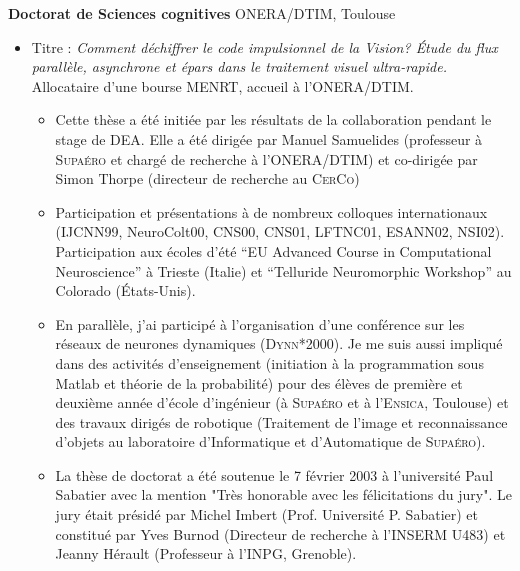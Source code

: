 \documentclass[10pt,french,a4paper,oneside]{article}%
\newcommand{\years}[1]{\marginpar{\textit{\scriptsize #1}}}
\begin{document}
\vspace*{.3cm}
	\textbf{Doctorat de Sciences cognitives} ONERA/DTIM, Toulouse \hfill \years{\textbf{1999-2003}} \\
\vspace*{-.15in}
\begin{itemize}
\item[] Titre : \emph{Comment déchiffrer le code impulsionnel de la Vision? \'Etude du flux parallèle, asynchrone et épars  dans le traitement visuel ultra-rapide.}  Allocataire d'une bourse MENRT, accueil à  l'ONERA/DTIM.
\begin{itemize}
		\item %
		Cette thèse a été initiée par les résultats de la collaboration pendant le stage de DEA. Elle a été dirigée par Manuel Samuelides (professeur à  \textsc{Supaéro} et chargé de recherche à  l'ONERA/DTIM) et co-dirigée par Simon Thorpe (directeur de recherche au \textsc{CerCo})
		\item Participation et présentations à  de nombreux colloques internationaux (IJCNN99, NeuroColt00, CNS00, CNS01, LFTNC01, ESANN02, NSI02). Participation aux écoles d'été ``EU Advanced Course in Computational Neuroscience'' à  Trieste (Italie) et ``Telluride Neuromorphic Workshop'' au Colorado (\'Etats-Unis).
		\item %
		En parallèle, j'ai participé à  l'organisation d'une conférence sur les réseaux de neurones dynamiques (\textsc{Dynn}*2000). Je me suis aussi impliqué dans des activités d'enseignement (initiation à  la programmation sous Matlab et théorie de la probabilité) pour des élèves de première et deuxième année d'école d'ingénieur (à  \textsc{Supaéro} et à  l'\textsc{Ensica}, Toulouse) et des travaux dirigés de robotique (Traitement de l'image et reconnaissance d'objets au laboratoire d'Informatique et d'Automatique de \textsc{Supaéro}). %
		\item %
		La thèse de doctorat a été soutenue le 7 février 2003 à  l'université Paul Sabatier avec la mention "Très honorable avec les félicitations du jury". Le jury était présidé par Michel Imbert (Prof. Université P. Sabatier) et constitué par Yves Burnod (Directeur de recherche à  l'\textsc{INSERM} U483) et Jeanny Hérault (Professeur à  l'INPG, Grenoble).
	\end{itemize} %
\end{itemize} %
\end{document}

